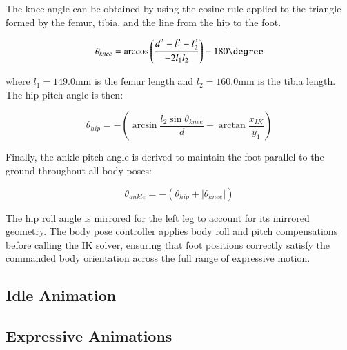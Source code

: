 The knee angle can be obtained by using the cosine rule applied to the triangle formed by the femur, tibia, and the line from the hip to the foot.

\begin{equation}
    \theta_{knee} = \arccos\left(\frac{d^2 - l_1^2 - l_2^2}
    {-2 l_1 l_2}\right) - 180\degree
\end{equation}

where $l_1 = 149.0$mm is the femur length and 
$l_2 = 160.0$mm is the tibia length. The hip pitch angle 
is then:

\begin{equation}
    \theta_{hip} = -\left(\arcsin\frac{l_2 \sin\theta_{knee}}
    {d} - \arctan\frac{x_{IK}}{y_1}\right)
\end{equation}

Finally, the ankle pitch angle is derived to maintain the 
foot parallel to the ground throughout all body poses:

\begin{equation}
    \theta_{ankle} = -(\theta_{hip} + |\theta_{knee}|)
\end{equation}

The hip roll angle is mirrored for the left leg to account 
for its mirrored geometry. The body pose controller applies body roll and pitch compensations before calling the IK solver, ensuring that foot positions correctly satisfy the commanded body orientation across the full range of expressive motion. %

\subsection{Idle Animation}
\subsection{Expressive Animations}

 



